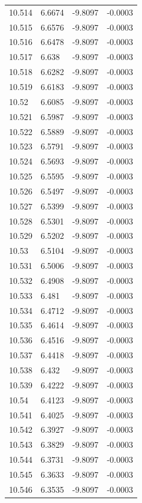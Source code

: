 \begin{tabular}{llll}
10.514 & 6.6674 & -9.8097 & -0.0003 \\
10.515 & 6.6576 & -9.8097 & -0.0003 \\
10.516 & 6.6478 & -9.8097 & -0.0003 \\
10.517 & 6.638 & -9.8097 & -0.0003 \\
10.518 & 6.6282 & -9.8097 & -0.0003 \\
10.519 & 6.6183 & -9.8097 & -0.0003 \\
10.52 & 6.6085 & -9.8097 & -0.0003 \\
10.521 & 6.5987 & -9.8097 & -0.0003 \\
10.522 & 6.5889 & -9.8097 & -0.0003 \\
10.523 & 6.5791 & -9.8097 & -0.0003 \\
10.524 & 6.5693 & -9.8097 & -0.0003 \\
10.525 & 6.5595 & -9.8097 & -0.0003 \\
10.526 & 6.5497 & -9.8097 & -0.0003 \\
10.527 & 6.5399 & -9.8097 & -0.0003 \\
10.528 & 6.5301 & -9.8097 & -0.0003 \\
10.529 & 6.5202 & -9.8097 & -0.0003 \\
10.53 & 6.5104 & -9.8097 & -0.0003 \\
10.531 & 6.5006 & -9.8097 & -0.0003 \\
10.532 & 6.4908 & -9.8097 & -0.0003 \\
10.533 & 6.481 & -9.8097 & -0.0003 \\
10.534 & 6.4712 & -9.8097 & -0.0003 \\
10.535 & 6.4614 & -9.8097 & -0.0003 \\
10.536 & 6.4516 & -9.8097 & -0.0003 \\
10.537 & 6.4418 & -9.8097 & -0.0003 \\
10.538 & 6.432 & -9.8097 & -0.0003 \\
10.539 & 6.4222 & -9.8097 & -0.0003 \\
10.54 & 6.4123 & -9.8097 & -0.0003 \\
10.541 & 6.4025 & -9.8097 & -0.0003 \\
10.542 & 6.3927 & -9.8097 & -0.0003 \\
10.543 & 6.3829 & -9.8097 & -0.0003 \\
10.544 & 6.3731 & -9.8097 & -0.0003 \\
10.545 & 6.3633 & -9.8097 & -0.0003 \\
10.546 & 6.3535 & -9.8097 & -0.0003 \\

\end{tabular}
